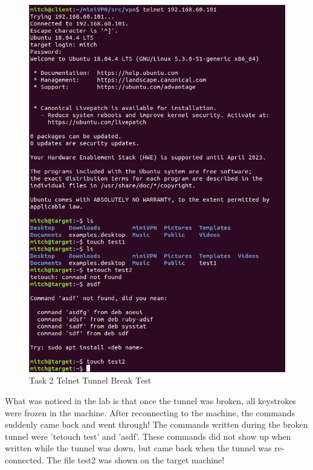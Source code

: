 \documentclass[12pt]{article}
\begin{document}
    \begin{figure}[H]
        \begin{center}
            \includegraphics[scale=0.5]{t2_telnet_tunnel_break.png}
        \end{center}{}
        \caption{Task 2 Telnet Tunnel Break Test}
        \label{fig:t2_telnet_tunnel_break}
    \end{figure}

    What was noticed in the lab is that once the tunnel was broken, all keystrokes were frozen in the machine. After reconnecting to the machine, the commands suddenly came back and went through! The commands written during the broken tunnel were 'tetouch test' and 'asdf'. These commands did not show up when written while the tunnel was down, but came back when the tunnel was re-connected. The file test2 was shown on the target machine!
\end{document}
